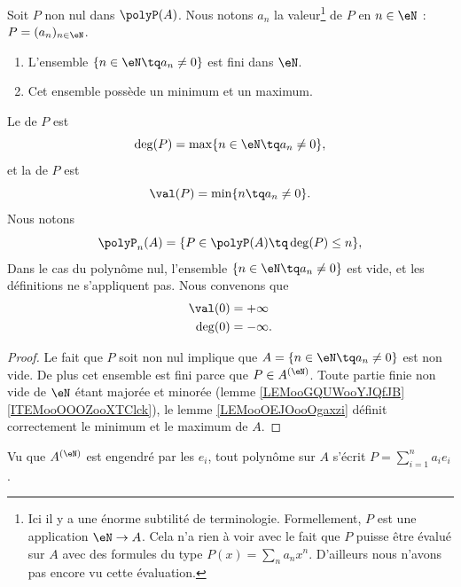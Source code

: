 \begin{propositionDef}  \label{DefDegrePoly}
	Soit \( P\) non nul dans \(\polyP(A)\). Nous notons \( a_n\) la valeur\footnote{Ici il y a une énorme subtilité de terminologie. Formellement, \( P\) est une application \( \eN\to A\). Cela n'a rien à voir avec le fait que \( P\) puisse être évalué sur \( A\) avec des formules du type \( P(x)=\sum_na_nx^n\). D'ailleurs nous n'avons pas encore vu cette évaluation.} de \( P\) en \( n\in \eN\) : \( P=(a_n)_{n\in \eN}\).
	\begin{enumerate}
		\item
		      L'ensemble \( \{ n\in \eN\tq a_n\neq 0 \}\) est fini dans \( \eN\).
		\item
		      Cet ensemble possède un minimum et un maximum.
	\end{enumerate}
	Le  de \( P\) est
	\begin{equation}
		\deg(P)=\max\{ n\in \eN\tq a_n\neq 0 \},
	\end{equation}
	et la  de \( P\) est
	\begin{equation}
		\val(P)=\min\{ n\tq a_n\neq 0 \}.
	\end{equation}
	Nous notons
	\begin{equation}		\label{EQooAULWooDgogWT}
		\polyP_n(A)=\{ P\in \polyP(A)\tq \deg(P)\leq n \},
	\end{equation}
	Dans le cas du polynôme nul, l'ensemble \( \{ n\in \eN\tq a_n\neq 0 \}\) est vide, et les définitions ne s'appliquent pas. Nous convenons que
	\begin{subequations}
		\begin{align}
			\val(0) & =+\infty  \\
			\deg(0) & =-\infty.
		\end{align}
	\end{subequations}
\end{propositionDef}

\begin{proof}
	Le fait que \( P\) soit non nul implique que \( A=\{ n\in \eN\tq a_n\neq 0 \}\) est non vide. De plus cet ensemble est fini parce que \( P\in A^{(\eN)}\). Toute partie finie non vide de \( \eN\) étant majorée et minorée (lemme \ref{LEMooGQUWooYJQfJB}\ref{ITEMooOOOZooXTClck}), le lemme \ref{LEMooOEJOooOgaxzi} définit correctement le minimum et le maximum de \( A\).
\end{proof}

Vu que \( A^{(\eN)}\) est engendré par les \( e_i\), tout polynôme sur \( A\) s'écrit \( P=\sum_{i=1}^na_ie_i\).

